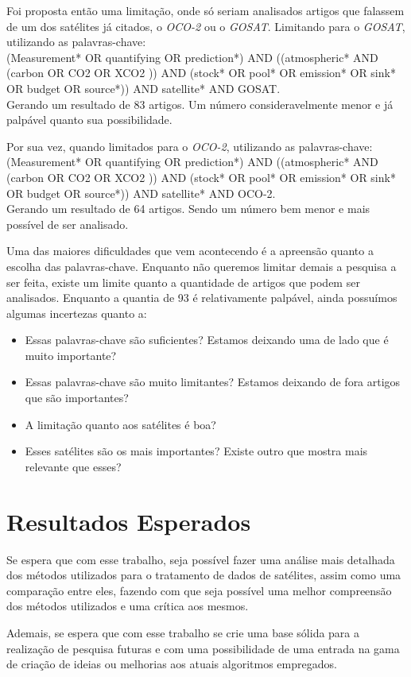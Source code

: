 \documentclass[12pt,a4paper]{article}
\begin{document}
Foi proposta então uma limitação, onde só seriam analisados artigos que falassem de um dos satélites
já citados, o \textit{OCO-2} ou o \textit{GOSAT}. Limitando para o \textit{GOSAT}, utilizando as
palavras-chave: \\
(Measurement* OR quantifying OR prediction*) AND ((atmospheric* AND (carbon OR CO2 OR
XCO2 )) AND (stock* OR pool* OR emission* OR sink* OR budget OR  source*)) AND satellite* AND GOSAT.\\
Gerando um resultado de 83 artigos. Um número consideravelmente menor e já palpável quanto sua possibilidade.  \par
Por sua vez, quando limitados para o \textit{OCO-2}, utilizando as palavras-chave: \\
(Measurement* OR
quantifying OR prediction*) AND ((atmospheric* AND (carbon OR CO2 OR XCO2 )) AND (stock* OR pool* OR
emission* OR sink* OR budget OR  source*)) AND satellite* AND OCO-2.\\
Gerando um resultado de 64 artigos. Sendo um número bem menor e mais possível de ser analisado. \par
Uma das maiores dificuldades que vem acontecendo é a apreensão quanto a escolha das palavras-chave. Enquanto não queremos limitar demais a pesquisa a ser feita, existe um limite quanto a quantidade de artigos que podem ser analisados. Enquanto a quantia de 93 é relativamente palpável, ainda possuímos algumas incertezas quanto a:
\begin{itemize}
    \item Essas palavras-chave são suficientes? Estamos deixando uma de lado que é muito importante?
    \item Essas palavras-chave são muito limitantes? Estamos deixando de fora artigos que são importantes?
    \item A limitação quanto aos satélites é boa?
    \item Esses satélites são os mais importantes? Existe outro que mostra mais relevante que esses?
\end{itemize}
\section{Resultados Esperados}

Se espera que com esse trabalho, seja possível fazer uma análise mais detalhada dos métodos utilizados para o tratamento de dados de satélites, assim como uma comparação entre eles, fazendo com que seja possível uma melhor compreensão dos métodos utilizados e uma crítica aos mesmos. \par

Ademais, se espera que com esse trabalho se crie uma base sólida para a realização de pesquisa futuras e com uma possibilidade de uma entrada na gama de criação de ideias ou melhorias aos atuais algoritmos empregados.
\end{document}
